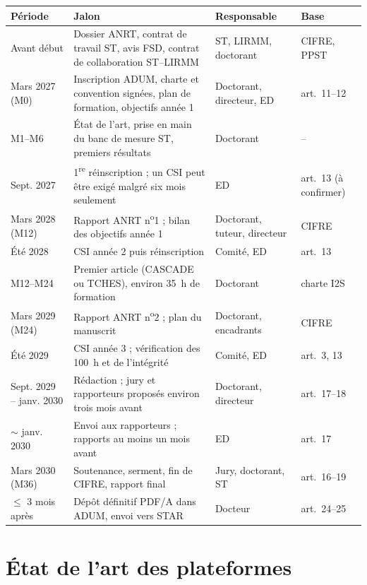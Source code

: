\documentclass[11pt,a4paper]{article}
\begin{document}
\begin{center}\small
\begin{tabularx}{\linewidth}{P{2.9cm} L P{2.8cm} P{1.9cm}}
\toprule
\textbf{Période} & \textbf{Jalon} & \textbf{Responsable} & \textbf{Base}\\
\midrule
Avant début & Dossier ANRT, contrat de travail ST, avis FSD, contrat de collaboration ST--LIRMM & ST, LIRMM, doctorant & CIFRE, PPST\\
Mars 2027 (M0) & Inscription ADUM, charte et convention signées, plan de formation, objectifs année 1 & Doctorant, directeur, ED & art.~11--12\\
M1--M6 & État de l'art, prise en main du banc de mesure ST, premiers résultats & Doctorant & --\\
Sept. 2027 & 1\textsuperscript{re} réinscription ; un CSI peut être exigé malgré six mois seulement & ED & art.~13 (à confirmer)\\
Mars 2028 (M12) & Rapport ANRT n\textsuperscript{o}1 ; bilan des objectifs année 1 & Doctorant, tuteur, directeur & CIFRE\\
Été 2028 & CSI année 2 puis réinscription & Comité, ED & art.~13\\
M12--M24 & Premier article (CASCADE ou TCHES), environ 35~h de formation & Doctorant & charte I2S\\
Mars 2029 (M24) & Rapport ANRT n\textsuperscript{o}2 ; plan du manuscrit & Doctorant, encadrants & CIFRE\\
Été 2029 & CSI année 3 ; vérification des 100~h et de l'intégrité & Comité, ED & art.~3, 13\\
Sept. 2029 -- janv. 2030 & Rédaction ; jury et rapporteurs proposés environ trois mois avant & Doctorant, directeur & art.~17--18\\
$\sim$ janv. 2030 & Envoi aux rapporteurs ; rapports au moins un mois avant & ED & art.~17\\
Mars 2030 (M36) & Soutenance, serment, fin de CIFRE, rapport final & Jury, doctorant, ST & art.~16--19\\
$\leq$ 3 mois après & Dépôt définitif PDF/A dans ADUM, envoi vers STAR & Docteur & art.~24--25\\
\bottomrule
\end{tabularx}
\end{center}

\section{État de l'art des plateformes}
\end{document}
